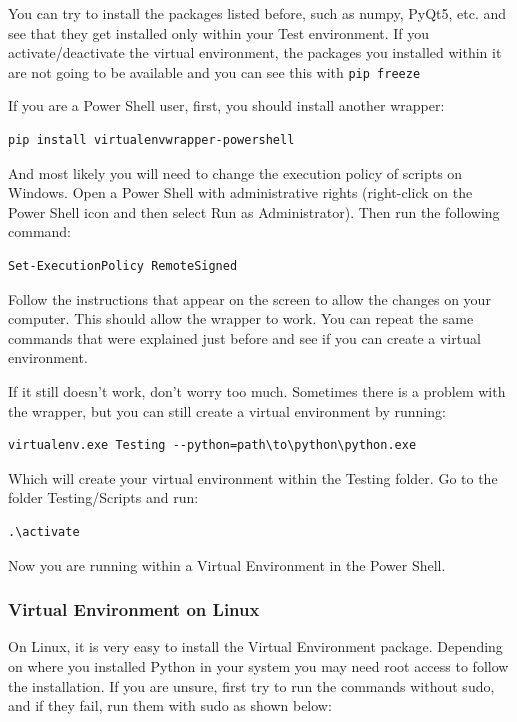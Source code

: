 You can try to install the packages listed before, such as numpy, PyQt5, etc. and see that they get installed only within your Test environment. If you activate/deactivate the virtual environment, the packages you installed within it are not going to be available and you can see this with \texttt{pip freeze}


If you are a Power Shell user, first, you should install another wrapper:

\begin{verbatim}
pip install virtualenvwrapper-powershell
\end{verbatim}

And most likely you will need to change the execution policy of scripts on Windows. Open a Power Shell with administrative rights (right-click on the Power Shell icon and then select Run as Administrator). Then run the following command:

\begin{verbatim}
Set-ExecutionPolicy RemoteSigned
\end{verbatim}

Follow the instructions that appear on the screen to allow the changes on your computer. This should allow the wrapper to work. You can repeat the same commands that were explained just before and see if you can create a virtual environment.

If it still doesn’t work, don’t worry too much. Sometimes there is a problem with the wrapper, but you can still create a virtual environment by running:
\begin{verbatim}
virtualenv.exe Testing --python=path\to\python\python.exe
\end{verbatim}

Which will create your virtual environment within the Testing folder. Go to the folder Testing/Scripts and run:
\begin{verbatim}
.\activate
\end{verbatim}

Now you are running within a Virtual Environment in the Power Shell.

\subsubsection{Virtual Environment on Linux}
On Linux, it is very easy to install the Virtual Environment package. Depending on where you installed Python in your system you may need root access to follow the installation. If you are unsure, first try to run the commands without sudo, and if they fail, run them with sudo as shown below:

